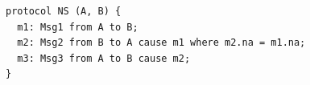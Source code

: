 \begin{lstlisting}[language={}]
protocol NS (A, B) {
  m1: Msg1 from A to B;
  m2: Msg2 from B to A cause m1 where m2.na = m1.na;
  m3: Msg3 from A to B cause m2;
}
\end{lstlisting}
